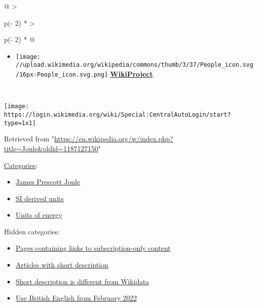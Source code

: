 \documentclass[
]{article}
\providecommand{\tightlist}{%
  \setlength{\itemsep}{0pt}\setlength{\parskip}{0pt}}
\newenvironment{LTR}{\beginL}{\endL}
\begin{document}
\begin{LTR}
\begin{otherlanguage}{english}
\begin{longtable}[]{@{}
  >{\raggedright\arraybackslash}p{(\columnwidth - 2\tabcolsep) * }
  >{\raggedright\arraybackslash}p{(\columnwidth - 2\tabcolsep) * }@{}}
{\begin{minipage}[t]{\linewidth}
\begin{itemize}
  \textbf{\href{/wiki/Portal:Energy}{Portal}}
\item
  {{\texttt{[image: //upload.wikimedia.org/wikipedia/commons/thumb/3/37/People\_icon.svg/16px-People\_icon.svg.png]}}}
  \textbf{\href{/wiki/Wikipedia:WikiProject_Energy}{WikiProject}}
\end{itemize}
\end{minipage}} \\
\end{longtable}

\end{otherlanguage}
\end{LTR}

\texttt{[image: https://login.wikimedia.org/wiki/Special:CentralAutoLogin/start?type=1x1]}

Retrieved from
"\url{https://en.wikipedia.org/w/index.php?title=Joule&oldid=1187127150}"

\label{catlinks}
\label{mw-normal-catlinks}
\href{/wiki/Help:Category}{Categories}:

\begin{itemize}
\tightlist
\item
  \href{/wiki/Category:James_Prescott_Joule}{James Prescott Joule}
\item
  \href{/wiki/Category:SI_derived_units}{SI derived units}
\item
  \href{/wiki/Category:Units_of_energy}{Units of energy}
\end{itemize}

\label{mw-hidden-catlinks}
Hidden categories:

\begin{itemize}
\tightlist
\item
  \href{/wiki/Category:Pages_containing_links_to_subscription-only_content}{Pages
  containing links to subscription-only content}
\item
  \href{/wiki/Category:Articles_with_short_description}{Articles with
  short description}
\item
  \href{/wiki/Category:Short_description_is_different_from_Wikidata}{Short
  description is different from Wikidata}
\item
  \href{/wiki/Category:Use_British_English_from_February_2022}{Use
  British English from February 2022}
\end{itemize}
\end{document}
